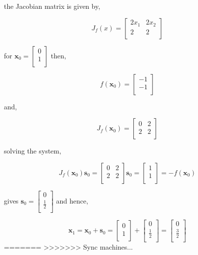 \documentclass{article}
\renewcommand{\vec}[1]{\mathbf{#1}}
\begin{document}
\begin{enumerate}
the Jacobian matrix is given by,

$$J_f(x)=\left[\begin{array}{cc} 2x_1 & 2x_2 \\ 2 & 2 \\ \end{array}\right]$$

for $\vec{x}_0=\left[\begin{array}{c} 0 \\ 1 \\ \end{array}\right]$ then,

$$f(\vec{x}_0)=\left[\begin{array}{c} -1 \\ -1 \\ \end{array}\right]$$

and,

$$J_f(\vec{x}_0)=\left[\begin{array}{cc} 0 & 2 \\ 2 & 2 \\ \end{array}\right]$$

solving the system,

$$J_f(\vec{x}_0)\vec{s}_0=\left[\begin{array}{cc} 0 & 2 \\ 2 & 2 \\ \end{array}\right]\vec{s}_0=\left[\begin{array}{c} 1 \\ 1 \\ \end{array}\right]=-f(\vec{x}_0)$$

gives $\vec{s}_0=\left[\begin{array}{c} 0 \\ \frac{1}{2} \\ \end{array}\right]$ and hence,

$$\vec{x}_1=\vec{x}_0+\vec{s}_0=\left[\begin{array}{c} 0 \\ 1 \\ \end{array}\right]+\left[\begin{array}{c} 0 \\ \frac{1}{2} \\ \end{array}\right]=\left[\begin{array}{c} 0 \\ \frac{3}{2} \\ \end{array}\right]$$
=======
>>>>>>> Sync machines...


\end{enumerate}
\end{document}
